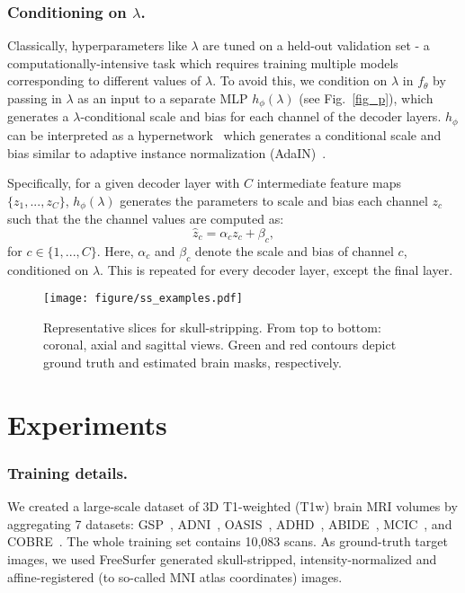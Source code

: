 \documentclass[runningheads]{llncs}
\begin{document}
\subsubsection{Conditioning on $\lambda$.}
Classically, hyperparameters like $\lambda$ are tuned on a held-out validation set - a computationally-intensive task which requires training multiple models corresponding to different values of $\lambda$. 
To avoid this, we condition on $\lambda$ in $f_\theta$ by passing in $\lambda$ as an input to a separate MLP $h_\phi(\lambda)$ (see Fig.~\ref{fig_p}), which generates a $\lambda$-conditional scale and bias for each channel of the decoder layers. 
$h_\phi$ can be interpreted as a hypernetwork~\cite{Ha2016,wang2022computing,Hoopes2021} which generates a conditional scale and bias similar to adaptive instance normalization (AdaIN)~\cite{huang2017arbitrary}.

Specifically, for a given decoder layer with $C$ intermediate feature maps $\{z_1, ..., z_C\}$, $h_\phi(\lambda)$ generates 
the parameters to scale and bias each channel $z_{c}$ such that the the channel values are computed as:
\begin{equation}
    \hat{z}_c = {\alpha_{c}z_{c}}+\beta_{c},
\end{equation}
for $c \in \{1, ..., C\}$.
Here, $\alpha_c$ and $\beta_c$ denote the scale and bias of channel $c$, conditioned on $\lambda$. 
This is repeated for every decoder layer, except the final layer.



\begin{figure}[t!]
\centering
\texttt{[image: figure/ss\_examples.pdf]}
\caption{Representative slices for skull-stripping. From top to bottom: coronal, axial and sagittal views. Green and red contours depict ground truth and estimated brain masks, respectively.} \label{fig1}
\end{figure}

\section{Experiments}

\subsubsection{Training details.} 
We created a large-scale dataset of 3D T1-weighted (T1w) brain MRI volumes by aggregating 7 datasets: GSP~\cite{Holmes2015}, ADNI~\cite{mueller2005alzheimer}, OASIS~\cite{marcus2010open}, ADHD~\cite{adhd}, ABIDE~\cite{de2017alzheimer}, MCIC~\cite{Gollub2013}, and COBRE~\cite{Aine2017}. 
The whole training set contains 10,083 scans. 
As ground-truth target images, we used FreeSurfer generated skull-stripped, intensity-normalized and affine-registered (to so-called MNI atlas coordinates) images.
\end{document}
